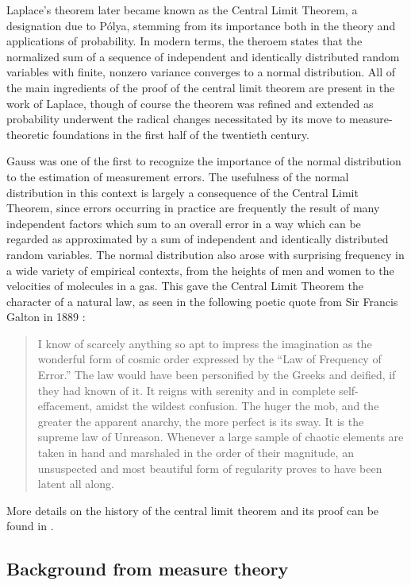 \documentclass{svjour3}
\begin{document}
Laplace's theorem later became known as the Central Limit Theorem, a designation due to P\'olya, stemming from its importance both in the theory and applications of probability. In modern terms, the theroem states that the normalized sum of a sequence of independent and identically distributed random variables with finite, nonzero variance converges to a normal distribution. All of the main ingredients of the proof of the central limit theorem are present in the work of Laplace, though of course the theorem was refined and extended as probability underwent the radical changes necessitated by its move to measure-theoretic foundations in the first half of the twentieth century.

Gauss was one of the first to recognize the importance of the normal distribution to the estimation of measurement errors. The usefulness of the normal distribution in this context is largely a consequence of the Central Limit Theorem, since errors occurring in practice are frequently the result of many independent factors which sum to an overall error in a way which can be regarded as approximated by a sum of independent and identically distributed random variables. The normal distribution also arose with surprising frequency in a wide variety of empirical contexts, from the heights of men and women to the velocities of molecules in a gas. This gave the Central Limit Theorem the character of a natural law, as seen in the following poetic quote from Sir Francis Galton in 1889 \cite{galton:89}:
\begin{quote}
 I know of scarcely anything so apt to impress the imagination as the wonderful form of cosmic order expressed by the ``Law of Frequency of Error.'' The law would have been personified by the Greeks and deified, if they had known of it. It reigns with serenity and in complete self-effacement, amidst the wildest confusion. The huger the mob, and the greater the apparent anarchy, the more perfect is its sway. It is the supreme law of Unreason. Whenever a large sample of chaotic elements are taken in hand and marshaled in the order of their magnitude, an unsuspected and most beautiful form of regularity proves to have been latent all along.
\end{quote}
More details on the history of the central limit theorem and its proof can be found in \cite{fischer}.

\subsection{Background from measure theory}
\end{document}
